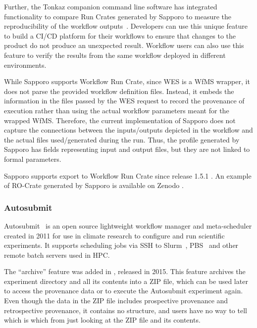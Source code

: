 Further, the Tonkaz companion command line software has integrated functionality to compare Run Crates generated by Sapporo to measure the reproducibility of the workflow outputs~\cite{Suetake 2023a}.
Developers can use this unique feature to build a CI/CD platform for their workflows to ensure that changes to the product do not produce an unexpected result.
Workflow users can also use this feature to verify the results from the same workflow deployed in different environments.

While Sapporo supports Workflow Run Crate, since WES is a WfMS wrapper, it does not parse the provided workflow definition files. 
Instead, it embeds the information in the files passed by the WES request to record the provenance of execution rather than using the actual workflow parameters meant for the wrapped WfMS.
Therefore, the current implementation of Sapporo does not capture the connections between the inputs/outputs depicted in the workflow and the actual files used/generated during the run.
Thus, the profile generated by Sapporo has fields representing input and output files, but they are not linked to formal parameters.

Sapporo supports export to Workflow Run Crate since release 1.5.1 \cite{Suetake 2023b}. An example of RO-Crate generated by Sapporo is available on Zenodo \cite{Ohta 2023}.

\subsubsection{Autosubmit}\label{ch54:autosubmit}

Autosubmit~\cite{Manubens-Gil 2016} is an open source lightweight workflow manager and meta-scheduler created in 2011 for use in climate research to configure and run scientific experiments.
It supports scheduling jobs via SSH to Slurm~\cite{Yoo 2003}, PBS~\cite{Feng 2007} and other remote batch servers used in HPC.

The ``archive'' feature was added in , released in 2015.
This feature archives the experiment directory and all its contents into a \gls{ZIP} file, which can be used later to access the provenance data or to execute the Autosubmit experiment again.
Even though the data in the ZIP file includes prospective provenance and retrospective provenance, it contains no structure, and users have no way to tell which is which from just looking at the ZIP file and its contents.

